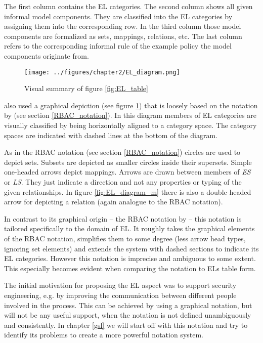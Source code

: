 \documentclass[twoside, openright, 12pt]{book}
\begin{document}
\noindent
The first column contains the EL categories.
The second column shows all given informal model components.
They are classified into the EL categories by assigning them into the corresponding row.
In the third column those model components are formalized as sets, mappings, relations, etc.
The last column refers to the corresponding informal rule of the example policy the model components originate from.

\begin{figure}[htb]
	\centering
	\texttt{[image: ../figures/chapter2/EL\_diagram.png]}
	\caption{Visual summary of figure \ref{fig:EL_table} \cite[p.76, figure 4.3]{Amthor18}}
	\label{fig:EL_diagram}
\end{figure}

\cite{Amthor18} also used a graphical depiction (see figure \ref{fig:EL_diagram}) that is loosely based on the notation by \cite{Sandhu96} (see section \ref{RBAC_notation}).
In this diagram members of EL categories are visually classified by being horizontally aligned to a category space.
The category spaces are indicated with dashed lines at the bottom of the diagram.

As in the RBAC notation (see section \ref{RBAC_notation}) circles are used to depict sets.
Subsets are depicted as smaller circles inside their supersets.
Simple one-headed arrows depict mappings.
Arrows are drawn between members of \textit{ES} or \textit{LS}.
They just indicate a direction and not any properties or typing of the given relationships.
In figure \ref{fig:EL_diagram_m} there is also a double-headed arrow for depicting a relation (again analogue to the RBAC notation).

In contrast to its graphical origin -- the RBAC notation by \cite{Sandhu96} -- this notation is tailored specifically to the domain of EL.
It roughly takes the graphical elements of the RBAC notation, simplifies them to some degree (less arrow head types, ignoring set elements) and extends the system with dashed sections to indicate its EL categories.
However this notation is imprecise and ambiguous to some extent.
This especially becomes evident when comparing the notation to ELs table form.

The initial motivation for proposing the EL aspect was to support security engineering, e.g. by improving the communication between different people involved in the process.
This can be achieved by using a graphical notation, but will not be any useful support, when the notation is not defined unambiguously and consistently.
In chapter \ref{gsl} we will start off with this notation and try to identify its problems to create a more powerful notation system.
\end{document}
